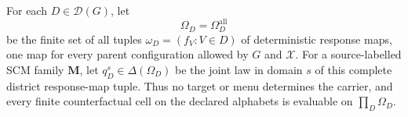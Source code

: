 For each \(D\in\mathcal D(G)\), let
\[
\Omega_D=\Omega_D^{\mathrm{all}}
\]
be the finite set of all tuples \(\omega_D=(f_V:V\in D)\) of deterministic response maps, one map for every parent configuration allowed by \(G\) and \(\mathcal X\).  For a source-labelled SCM family \(\mathbf M\), let \(q_D^s\in\Delta(\Omega_D)\) be the joint law in domain \(s\) of this complete district response-map tuple.  Thus no target or menu determines the carrier, and every finite counterfactual cell on the declared alphabets is evaluable on \(\prod_D\Omega_D\).
